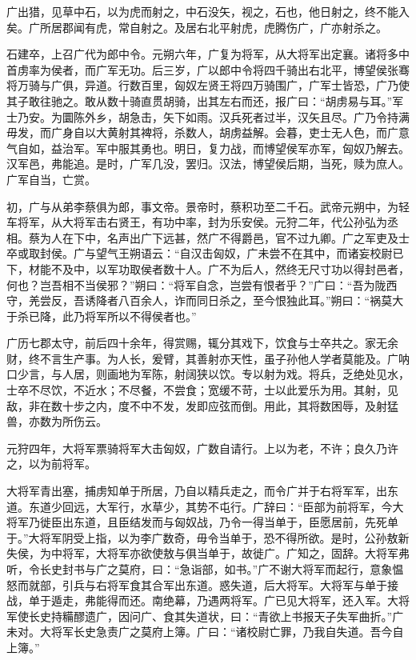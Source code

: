 \documentclass[12pt,UTF8]{ctexbook}
\begin{document}
广出猎，见草中石，以为虎而射之，中石没矢，视之，石也，他日射之，终不能入矣。广所居郡闻有虎，常自射之。及居右北平射虎，虎腾伤广，广亦射杀之。



石建卒，上召广代为郎中令。元朔六年，广复为将军，从大将军出定襄。诸将多中首虏率为侯者，而广军无功。后三岁，广以郎中令将四千骑出右北平，博望侯张骞将万骑与广俱，异道。行数百里，匈奴左贤王将四万骑围广，广军士皆恐，广乃使其子敢往驰之。敢从数十骑直贯胡骑，出其左右而还，报广曰：“胡虏易与耳。”军士乃安。为圜陈外乡，胡急击，矢下如雨。汉兵死者过半，汉矢且尽。广乃令持满毋发，而广身自以大黄射其裨将，杀数人，胡虏益解。会暮，吏士无人色，而广意气自如，益治军。军中服其勇也。明日，复力战，而博望侯军亦军，匈奴乃解去。汉军邑，弗能追。是时，广军几没，罢归。汉法，博望侯后期，当死，赎为庶人。广军自当，亡赏。



初，广与从弟李蔡俱为郎，事文帝。景帝时，蔡积功至二千石。武帝元朔中，为轻车将军，从大将军击右贤王，有功中率，封为乐安侯。元狩二年，代公孙弘为丞相。蔡为人在下中，名声出广下远甚，然广不得爵邑，官不过九卿。广之军吏及士卒或取封侯。广与望气王朔语云：“自汉击匈奴，广未尝不在其中，而诸妄校尉已下，材能不及中，以军功取侯者数十人。广不为后人，然终无尺寸功以得封邑者，何也？岂吾相不当侯邪？”朔曰：“将军自念，岂尝有恨者乎？”广曰：“吾为陇西守，羌尝反，吾诱降者八百余人，诈而同日杀之，至今恨独此耳。”朔曰：“祸莫大于杀已降，此乃将军所以不得侯者也。”



广历七郡太守，前后四十余年，得赏赐，辄分其戏下，饮食与士卒共之。家无余财，终不言生产事。为人长，爰臂，其善射亦天性，虽子孙他人学者莫能及。广呐口少言，与人居，则画地为军陈，射阔狭以饮。专以射为戏。将兵，乏绝处见水，士卒不尽饮，不近水；不尽餐，不尝食；宽缓不苛，士以此爱乐为用。其射，见敌，非在数十步之内，度不中不发，发即应弦而倒。用此，其将数困辱，及射猛兽，亦数为所伤云。



元狩四年，大将军票骑将军大击匈奴，广数自请行。上以为老，不许；良久乃许之，以为前将军。



大将军青出塞，捕虏知单于所居，乃自以精兵走之，而令广并于右将军军，出东道。东道少回远，大军行，水草少，其势不屯行。广辞曰：“臣部为前将军，今大将军乃徙臣出东道，且臣结发而与匈奴战，乃令一得当单于，臣愿居前，先死单于。”大将军阴受上指，以为李广数奇，毋令当单于，恐不得所欲。是时，公孙敖新失侯，为中将军，大将军亦欲使敖与俱当单于，故徙广。广知之，固辞。大将军弗听，令长史封书与广之莫府，曰：“急诣部，如书。”广不谢大将军而起行，意象愠怒而就部，引兵与右将军食其合军出东道。惑失道，后大将军。大将军与单于接战，单于遁走，弗能得而还。南绝幕，乃遇两将军。广已见大将军，还入军。大将军使长史持糒醪遗广，因问广、食其失道状，曰：“青欲上书报天子失军曲折。”广未对。大将军长史急责广之莫府上簿。广曰：“诸校尉亡罪，乃我自失道。吾今自上簿。”
\end{document}
